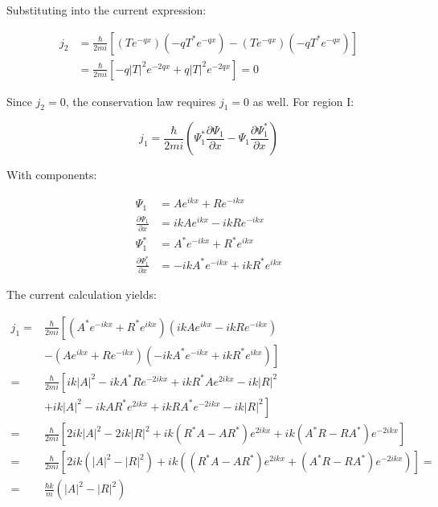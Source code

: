 \documentclass[10pt]{article}
\begin{document}
Substituting into the current expression:

\begin{align*}
j_{2} & =\frac{\hbar}{2 m i}\left[\left(T e^{-q x}\right)\left(-q T^{*} e^{-q x}\right)-\left(T e^{-q x}\right)\left(-q T^{*} e^{-q x}\right)\right] \\
& =\frac{\hbar}{2 m i}\left[-q|T|^{2} e^{-2 q x}+q|T|^{2} e^{-2 q x}\right]=0 \tag{6.45}
\end{align*}

Since $j_2 = 0$, the conservation law requires $j_1 = 0$ as well. For region I:

\begin{equation*}
j_{1}=\frac{\hbar}{2 m i}\left(\Psi_{1}^{*} \frac{\partial \Psi_{1}}{\partial x}-\Psi_{1} \frac{\partial \Psi_{1}^{*}}{\partial x}\right) \tag{6.46}
\end{equation*}

With components:

\begin{align*}
\Psi_{1} & =A e^{i k x}+R e^{-i k x} \\
\frac{\partial \Psi_{1}}{\partial x} & =i k A e^{i k x}-i k R e^{-i k x}  \tag{6.47}\\
\Psi_{1}^{*} & =A^{*} e^{-i k x}+R^{*} e^{i k x} \\
\frac{\partial \Psi_{1}^{*}}{\partial x} & =-i k A^{*} e^{-i k x}+i k R^{*} e^{i k x}
\end{align*}

The current calculation yields:

\begin{align*}
j_{1}= & \frac{\hbar}{2 m i}\left[\left(A^{*} e^{-i k x}+R^{*} e^{i k x}\right)\left(i k A e^{i k x}-i k R e^{-i k x}\right)\right. \\
& \left.-\left(A e^{i k x}+R e^{-i k x}\right)\left(-i k A^{*} e^{-i k x}+i k R^{*} e^{i k x}\right)\right] \\
= & \frac{\hbar}{2 m i}\left[i k|A|^{2}-i k A^{*} R e^{-2 i k x}+i k R^{*} A e^{2 i k x}-i k|R|^{2}\right. \\
& \left.+i k|A|^{2}-i k A R^{*} e^{2 i k x}+i k R A^{*} e^{-2 i k x}-i k|R|^{2}\right] \\
= & \frac{\hbar}{2 m i}\left[2 i k|A|^{2}-2 i k|R|^{2}+i k\left(R^{*} A-A R^{*}\right) e^{2 i k x}+i k\left(A^{*} R-R A^{*}\right) e^{-2 i k x}\right] \\
= & \frac{\hbar}{2 m i}\left[2 i k\left(|A|^{2}-|R|^{2}\right)+i k\left(\left(R^{*} A-A R^{*}\right) e^{2 i k x}+\left(A^{*} R-R A^{*}\right) e^{-2 i k x}\right)\right]= \\
= & \frac{\hbar k}{m}\left(|A|^{2}-|R|^{2}\right) \tag{6.48}
\end{align*}
\end{document}
